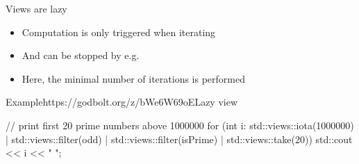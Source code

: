 \begin{frame}[fragile]
  \begin{block}{Views are lazy}
    \begin{itemize}
    \item Computation is only triggered when iterating
    \item And can be stopped by e.g. 
    \item Here, the minimal number of iterations is performed
    \end{itemize}
  \end{block}
  \begin{exampleblockGB}{Example}{https://godbolt.org/z/bWe6W69oE}{Lazy view}
    \begin{cppcode*}{}
      // print first 20 prime numbers above 1000000
      for (int i: std::views::iota(1000000)
                  | std::views::filter(odd)
                  | std::views::filter(isPrime)
                  | std::views::take(20)) {
        std::cout << i << " ";
      }
    \end{cppcode*}
  \end{exampleblockGB}
\end{frame}

